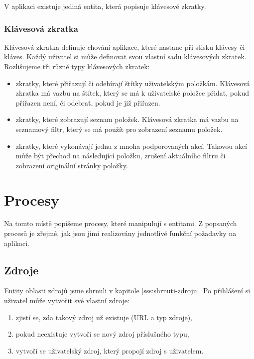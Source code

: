 V aplikaci existuje jediná entita, která popisuje klávesové zkratky.

\subsubsection{Klávesová zkratka}

Klávesová zkratka definuje chování aplikace, které nastane při stisku klávesy či kláves.
Každý uživatel si může definovat svou vlastní sadu klávesových zkratek.
Rozlišujeme tři různé typy klávesových zkratek:
\begin{itemize}
	\item zkratky, které přiřazují či odebírají štítky uživatelským položkám.
		Klávesová zkratka má vazbu na štítek, který se má k uživatelské položce přidat, pokud přiřazen není, či odebrat, pokud je již přiřazen.
	\item zkratky, které zobrazují seznam položek.
		Klávesová zkratka má vazbu na seznamový filtr, který se má použít pro zobrazení seznamu položek.
	\item zkratky, které vykonávají jednu z mnoha podporovaných akcí.
		Takovou akcí může být přechod na následující položku, zrušení aktuálního filtru či zobrazení originální stránky položky.
\end{itemize}

\section{Procesy}

Na tomto místě popíšeme procesy, které manipulují s entitami.
Z popsaných procesů je zřejmé, jak jsou jimi realizovány jednotlivé funkční požadavky na aplikaci.

\subsection{Zdroje}

Entity oblasti zdrojů jsme shrnuli v kapitole \ref{sss:shrnuti-zdroju}.
Po přihlášení si uživatel může vytvořit své vlastní zdroje:
\begin{enumerate}
	\item zjistí se, zda takový zdroj už existuje (URL a typ zdroje),
	\item pokud neexistuje vytvoří se nový zdroj příslušného typu,
	\item vytvoří se uživatelský zdroj, který propojí zdroj s uživatelem.
\end{enumerate}


